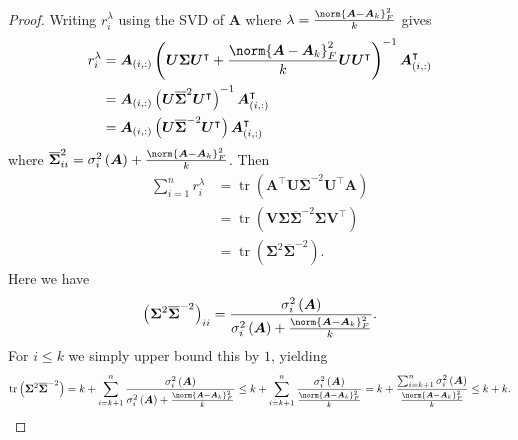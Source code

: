 \begin{proof}
    Writing $r_{i}^{\lambda}$ using the SVD of $\bm{A}$ where $\lambda = \frac{\norm{\bm{A} - \bm{A}_k}_F^{2}}{k}$ gives
    \begin{align*}
        r_{i}^{\lambda} & = \bm{A}_{(i,:)} \left( \bm{U} \bm{\Sigma} \bm{U}^{\intercal} + \frac{\norm{\bm{A} - \bm{A}_k}_F^{2}}{k} \bm{U} \bm{U}^{\intercal} \right)^{-1} \bm{A}_{(i,:)}^{\intercal} \\
                        & = \bm{A}_{(i,:)} \left( \bm{U} \overline{\bm{\Sigma}}^2 \bm{U}^{\intercal} \right)^{-1} \bm{A}_{(i,:)}^{\intercal}                                                         \\
                        & = \bm{A}_{(i,:)} \left( \bm{U} \overline{\bm{\Sigma}}^{-2} \bm{U}^{\intercal} \right) \bm{A}_{(i,:)}^{\intercal}
    \end{align*}
    where $\overline{\bm{\Sigma}}^{2}_{ii} = \sigma_{i}^{2} \left( \bm{A} \right) + \frac{\norm{\bm{A} - \bm{A}_k}_F^{2}}{k}$. Then
    \begin{align*}
        \sum_{i=1}^{n} r_{i}^{\lambda} & = \operatorname{tr} \left( \bm{A}^{\intercal} \bm{U} \overline{\bm{\Sigma}}^{-2} \bm{U}^{\intercal} \bm{A} \right) \\
                                       & = \operatorname{tr} \left( \bm{V} \bm{\Sigma} \overline{\bm{\Sigma}}^{-2} \bm{\Sigma} \bm{V}^{\intercal} \right)   \\
                                       & = \operatorname{tr} \left( \bm{\Sigma}^{2} \overline{\bm{\Sigma}}^{-2} \right).
    \end{align*}
    Here we have
    \[
        \left( \bm{\Sigma}^{2} \overline{\bm{\Sigma}}^{-2} \right)_{ii} = \frac{\sigma_{i}^{2} \left( \bm{A} \right)}{\sigma_{i}^{2} \left( \bm{A} \right) + \frac{\norm{\bm{A} - \bm{A}_k}_F^{2}}{k}}.
    \]
    For $i \leq k$ we simply upper bound this by $1$, yielding
    \begin{equation*}
        \operatorname{tr} \left( \bm{\Sigma}^{2} \overline{\bm{\Sigma}}^{-2} \right) =
        k + \sum_{i=k+1}^{n} \frac{\sigma_{i}^{2} \left( \bm{A} \right)}{\sigma_{i}^{2} \left( \bm{A} \right) + \frac{\norm{\bm{A} - \bm{A}_k}_F^{2}}{k}}
        \leq k + \sum_{i=k+1}^{n} \frac{\sigma_{i}^{2} \left( \bm{A} \right)}{\frac{\norm{\bm{A} - \bm{A}_k}_F^{2}}{k}}
        = k + \frac{\sum_{i=k+1}^{n} \sigma_{i}^{2} \left( \bm{A} \right)}{\frac{\norm{\bm{A} - \bm{A}_k}_F^{2}}{k}}
        \leq k + k.
    \end{equation*}
\end{proof}
